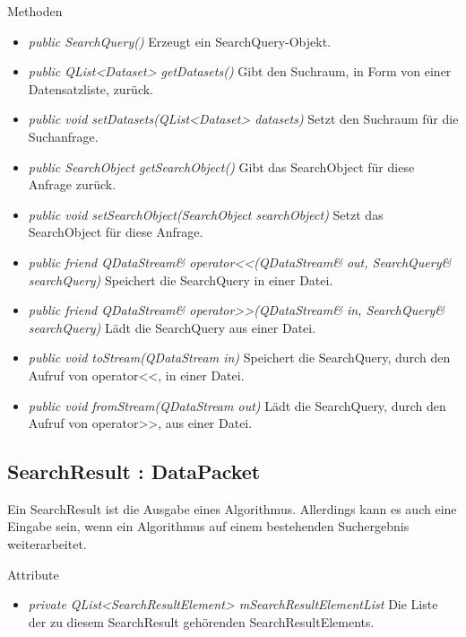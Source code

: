 Methoden
\begin{itemize}
\item \textit{public SearchQuery()} Erzeugt ein SearchQuery-Objekt.
\item \textit{public QList<Dataset> getDatasets()} Gibt den Suchraum, in Form von einer Datensatzliste, zurück.
\item \textit{public void setDatasets(QList<Dataset> datasets)} Setzt den Suchraum für die Suchanfrage.
\item \textit{public SearchObject getSearchObject()} Gibt das SearchObject für diese Anfrage zurück.
\item \textit{public void setSearchObject(SearchObject searchObject)} Setzt das SearchObject für diese Anfrage.
\item \textit{public friend QDataStream\& operator<<(QDataStream\& out, SearchQuery\& searchQuery)} Speichert die SearchQuery in einer Datei.
\item \textit{public friend QDataStream\& operator>>(QDataStream\& in, SearchQuery\& searchQuery)} Lädt die SearchQuery aus einer Datei.
\item \textit{public void toStream(QDataStream in)} Speichert die SearchQuery, durch den Aufruf von operator<<, in einer Datei.
\item \textit{public void fromStream(QDataStream out)} Lädt die SearchQuery, durch den Aufruf von operator>>, aus einer Datei.
\end{itemize}

\subsection*{SearchResult : DataPacket}
Ein SearchResult ist die Ausgabe eines Algorithmus. Allerdings kann es auch eine Eingabe sein, wenn ein Algorithmus auf einem bestehenden Suchergebnis weiterarbeitet.

Attribute
\begin{itemize}
\item\textit{private QList<SearchResultElement> mSearchResultElementList} Die Liste der zu diesem SearchResult gehörenden SearchResultElements.
\end{itemize}

